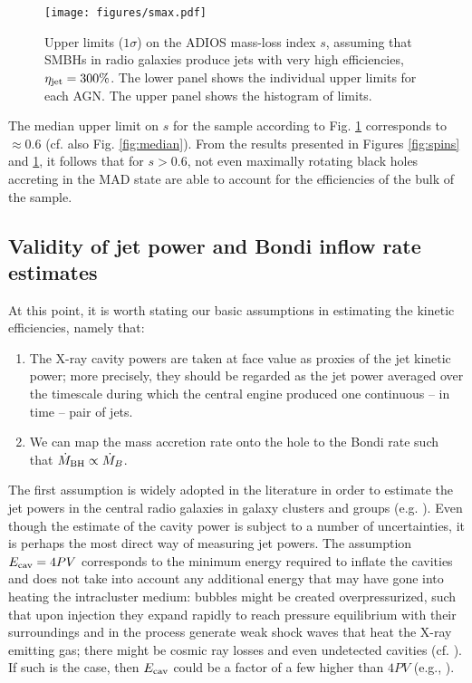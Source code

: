 \documentclass[useAMS,usenatbib]{mn2e}
\begin{document}
\begin{figure}
\centering
\texttt{[image: figures/smax.pdf]}
\caption{Upper limits ($1\sigma$) on the ADIOS mass-loss index $s$, assuming that SMBHs in radio galaxies produce jets with very high efficiencies, $\eta_{\rm jet}=300\%$. The lower panel shows the individual upper limits for each AGN. The upper panel shows the histogram of limits. }
\label{fig:smax}
\end{figure}

The median upper limit on $s$ for the sample according to Fig. \ref{fig:smax} corresponds to $\approx 0.6$ (cf. also Fig. \ref{fig:median}). From the results presented in Figures \ref{fig:spins} and \ref{fig:smax}, it follows that for $s > 0.6$, not even maximally rotating black holes accreting in the MAD state are able to account for the efficiencies of the bulk of the sample. 





\subsection{Validity of jet power and Bondi inflow rate estimates}	\label{sec:bondi}

At this point, it is worth stating our basic assumptions in estimating the kinetic efficiencies, namely that:
\begin{enumerate}
\item The X-ray cavity powers are taken at face value as proxies of the jet kinetic power; more precisely, they should be regarded as the jet power averaged over the timescale during which the central engine produced one continuous -- in time -- pair of jets.
\item We can map the mass accretion rate onto the hole to the Bondi rate such that $\dot{M}_{\rm BH} \propto \dot{M}_B$.
\end{enumerate}

The first assumption is widely adopted in the literature in order to estimate the jet powers in the central radio galaxies in galaxy clusters and groups (e.g. \citealt{Cavagnolo10,OSullivan11, McNamara12,Nemmen12,Fabian12,Hlavacek-Larrondo13,King13}). Even though the estimate of the cavity power is subject to a number of uncertainties, it is perhaps the most direct way of measuring jet powers.
The assumption $E_{\rm cav}=4 PV$ corresponds to the minimum energy required to inflate the cavities and does not take into account any additional energy that may have gone into heating the intracluster medium: bubbles might be created overpressurized, such that upon injection they expand rapidly to reach pressure equilibrium with their surroundings and in the process generate weak shock waves that heat the X-ray emitting gas; there might be cosmic ray losses and even undetected cavities (cf. \citealt{McNamara12}). If such is the case, then $E_{\rm cav}$ could be a factor of a few higher than $4 PV$ (e.g., \citealt{Nusser06}).
\end{document}
